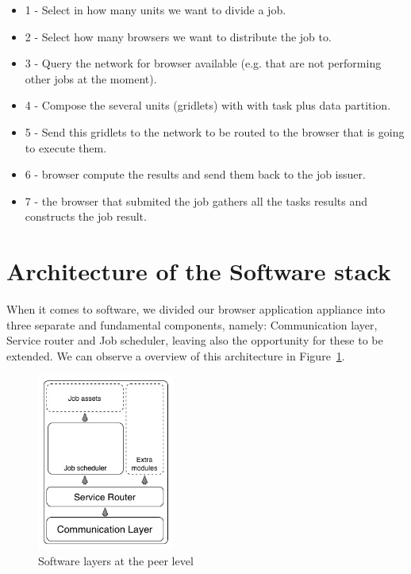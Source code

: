 \begin{itemize}
    \item 1 - Select in how many units we want to divide a job.
    \item 2 - Select how many browsers we want to distribute the job to.
    \item 3 - Query the network for browser available (e.g. that are not performing other jobs at the moment).
    \item 4 - Compose the several units (gridlets) with with task plus data partition.
    \item 5 - Send this gridlets to the network to be routed to the browser that is going to execute them.
    \item 6 - browser compute the results and send them back to the job issuer.
    \item 7 - the browser that submited the job gathers all the tasks results and constructs the job result.
\end{itemize}

\section{Architecture of the Software stack}

When it comes to software, we divided our browser application appliance into three separate and fundamental components, namely: Communication layer, Service router and Job scheduler, leaving also the opportunity for these to be extended. We can observe a overview of this architecture in Figure~\ref{fig:s-a-n-l}.

\begin{figure}[h!]
  \centering
  \includegraphics[width=0.4\textwidth]{figs/software-architecture-node-level}
  \caption{Software layers at the peer level}
  \label{fig:s-a-n-l}
\end{figure}


